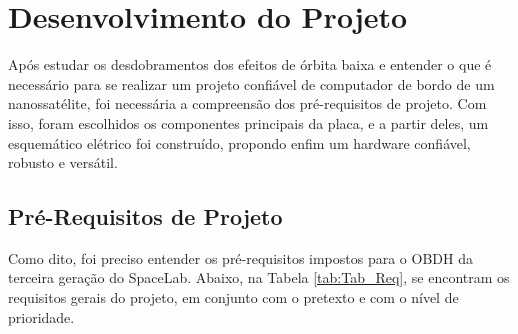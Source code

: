 \chapter{Desenvolvimento do Projeto}

Após estudar os desdobramentos dos efeitos de órbita baixa e entender o que é necessário para se realizar um projeto confiável de computador de bordo de um nanossatélite, foi necessária a compreensão dos pré-requisitos de projeto. Com isso, foram escolhidos os componentes principais da placa, e a partir deles, um esquemático elétrico foi construído, propondo enfim um hardware confiável, robusto e versátil.  

\section{Pré-Requisitos de Projeto}

Como dito, foi preciso entender os pré-requisitos impostos para o OBDH da terceira geração do SpaceLab. Abaixo, na Tabela \ref{tab:Tab_Req}, se encontram os requisitos gerais do projeto, em conjunto com o pretexto e com o nível de prioridade.

